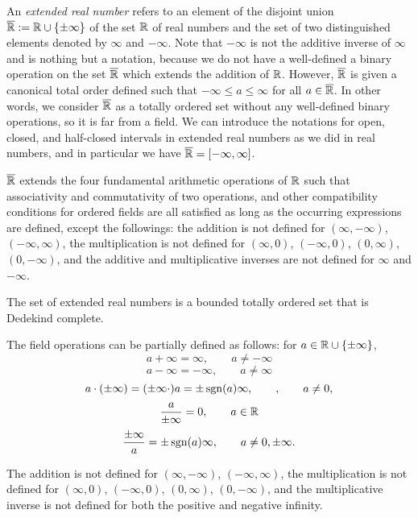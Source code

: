 \documentclass{../../large}
\begin{document}
\begin{prb}
An \emph{extended real number} refers to an element of the disjoint union $\overline{\mathbb{R}}:=\mathbb{R}\cup\{\pm\infty\}$ of the set $\mathbb{R}$ of real numbers and the set of two distinguished elements denoted by $\infty$ and $-\infty$.
Note that $-\infty$ is not the additive inverse of $\infty$ and is nothing but a notation, because we do not have a well-defined a binary operation on the set $\overline{\mathbb{R}}$ which extends the addition of $\mathbb{R}$.
However, $\overline{\mathbb{R}}$ is given a canonical total order defined such that $-\infty\le a\le\infty$ for all $a\in\overline{\mathbb{R}}$.
In other words, we consider $\overline{\mathbb{R}}$ as a totally ordered set without any well-defined binary operations, so it is far from a field.
We can introduce the notations for open, closed, and half-closed intervals in extended real numbers as we did in real numbers, and in particular we have $\overline{\mathbb{R}}=[-\infty,\infty]$.

\begin{parts}
\item $\overline{\mathbb{R}}$ extends the four fundamental arithmetic operations of $\mathbb{R}$ such that associativity and commutativity of two operations, and other compatibility conditions for ordered fields are all satisfied as long as the occurring expressions are defined, except the followings: the addition is not defined for $(\infty,-\infty)$, $(-\infty,\infty)$, the multiplication is not defined for $(\infty,0)$, $(-\infty,0)$, $(0,\infty)$, $(0,-\infty)$, and the additive and multiplicative inverses are not defined for $\infty$ and $-\infty$.
\item The set of extended real numbers is a bounded totally ordered set that is Dedekind complete.
\end{parts}

\end{prb}
\begin{pf}
The field operations can be partially defined as follows: for $a\in\mathbb{R}\cup\{\pm\infty\}$,
\[a+\infty=\infty,\qquad a\ne-\infty\]
\[a-\infty=-\infty,\qquad a\ne\infty\]
\[a\cdot(\pm\infty)=(\pm\infty\cdot)a=\pm\operatorname{sgn}(a)\infty,\qquad,\qquad a\ne0,\]
\[\frac a{\pm\infty}=0,\qquad a\in\mathbb{R}\]
\[\frac{\pm\infty}a=\pm\operatorname{sgn}(a)\infty,\qquad a\ne0,\pm\infty.\]

The addition is not defined for $(\infty,-\infty)$, $(-\infty,\infty)$, the multiplication is not defined for $(\infty,0)$, $(-\infty,0)$, $(0,\infty)$, $(0,-\infty)$, and the multiplicative inverse is not defined for both the positive and negative infinity.

\end{pf}
\end{document}
